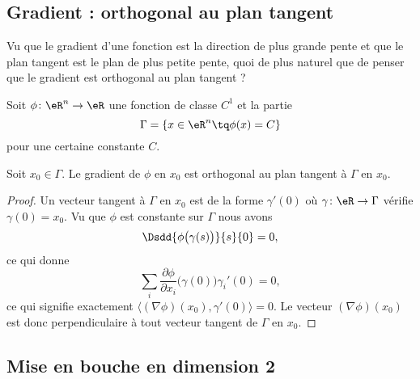 \subsection{Gradient : orthogonal au plan tangent}

Vu que le gradient d'une fonction est la direction de plus grande pente et que le plan tangent est le plan de plus petite pente, quoi de plus naturel que de penser que le gradient est orthogonal au plan tangent ?

\begin{lemma}
	Soit \( \phi\colon \eR^n\to \eR\) une fonction de classe \( C^1\) et la partie
	\begin{equation}
		\Gamma=\{ x\in \eR^n\tq \phi(x)=C \}
	\end{equation}
	pour une certaine constante \( C\).

	Soit \( x_0\in \Gamma\). Le gradient de \( \phi\) en \( x_0\) est orthogonal au plan tangent à \( \Gamma\) en \( x_0\).
\end{lemma}

\begin{proof}
	Un vecteur tangent à \( \Gamma\) en \( x_0\) est de la forme \( \gamma'(0)\) où \( \gamma\colon \eR \to \Gamma\) vérifie \( \gamma(0)=x_0\). Vu que \( \phi\) est constante sur \( \Gamma\) nous avons
	\begin{equation}
		\Dsdd{ \phi\big( \gamma(s) \big) }{s}{0}=0,
	\end{equation}
	ce qui donne
	\begin{equation}
		\sum_i\frac{ \partial \phi }{ \partial x_i }\big( \gamma(0) \big)\gamma_i'(0)=0,
	\end{equation}
	ce qui signifie exactement \( \langle (\nabla\phi)(x_0), \gamma'(0)\rangle=0\). Le vecteur \( (\nabla\phi)(x_0)\) est donc perpendiculaire à tout vecteur tangent de \( \Gamma\) en \( x_0\).
\end{proof}

\subsection{Mise en bouche en dimension 2}

